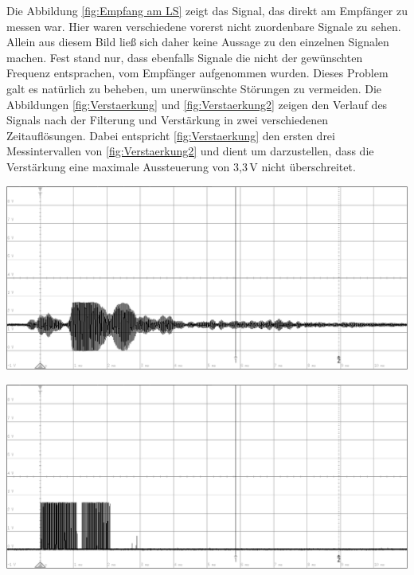 Die Abbildung \ref{fig:Empfang am LS} zeigt das Signal, das direkt am Empfänger zu messen war. Hier waren verschiedene vorerst nicht zuordenbare Signale zu sehen. Allein aus diesem Bild ließ sich daher keine Aussage zu den einzelnen Signalen machen. Fest stand nur, dass ebenfalls Signale die nicht der gewünschten Frequenz entsprachen, vom Empfänger aufgenommen wurden. Dieses Problem galt es natürlich zu beheben, um unerwünschte Störungen zu vermeiden.
Die Abbildungen \ref{fig:Verstaerkung} und \ref{fig:Verstaerkung2} zeigen den Verlauf des Signals nach der Filterung und Verstärkung in zwei verschiedenen Zeitauflösungen. Dabei entspricht \ref{fig:Verstaerkung} den ersten drei Messintervallen von \ref{fig:Verstaerkung2} und dient um darzustellen, dass die Verstärkung eine maximale Aussteuerung von 3,3\,V nicht überschreitet.\\
\begin{minipage}{0.46\textwidth}
\includegraphics[width=1\textwidth%
]{Abbildungen/MessungenP1/Signal-nach-Verstarkung2.png}
\label{fig:Verstaerkung2}
\end{minipage}\qquad
\begin{minipage}{0.46\textwidth}
\includegraphics[width=1\textwidth%
]{Abbildungen/MessungenP1/Signal-nach-Komparator.png}
\label{fig:Komparator}
\end{minipage}\\
